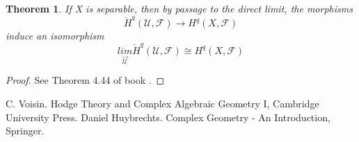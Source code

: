 \documentclass{article}
\numberwithin{equation}{subsection} %
\newtheorem{defi}{Definition}[section]
\newtheorem{thm}{Theorem}[section]
\theoremstyle{definition}
\begin{document}
\begin{thm}
If X is separable, then by passage to the direct limit, the morphisms
$$\check{H}^q(\mathcal{U},\mathcal{F})\to H^q(X,\mathcal{F})$$
induce an isomorphism
$$\underset{  \overset{\to}{\mathcal{U}}   }{lim}\check{H}^q(\mathcal{U},\mathcal{F})\cong H^q(X,\mathcal{F})$$
\end{thm}
\begin{proof}
	See Theorem 4.44 of book \cite{voisin}.
\end{proof}
% 
% 
% 
% 
% 
% 
% 
% 

\begin{thebibliography}{1}
	 C. Voisin. Hodge Theory and Complex Algebraic
	Geometry I, Cambridge University Press.
	 Daniel Huybrechts. Complex Geometry - An
	Introduction, Springer.
\end{thebibliography}
\end{document}
